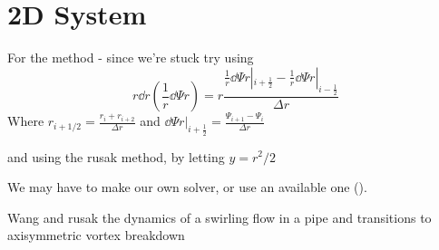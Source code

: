 \documentclass{X:/Documents/Coding/Latex/myreport}
\begin{document}
\clearpage















\section{2D System}
For the method - since we're stuck
try using
\[r\dd{}r \left(\frac1r \dd \Psi r\right) = r\frac{\frac1r \dd\Psi r|_{i+\frac12} - \frac1r \dd{\Psi}{r}|_{i-\frac12}}{\Delta r}\]
Where $r_{i+1/2} = \frac{r_i + r_{i+2}}{\Delta r}$ and $\dd\Psi r |_{i+\frac12} = \frac{\Psi_{i+1} - \Psi_i}{\Delta r}$

and using the rusak method, by letting $y = r^2/2$

We may have to make our own solver, or use an available one ().

Wang and rusak the dynamics of a swirling flow in a pipe and transitions to axisymmetric vortex breakdown
\end{document}

